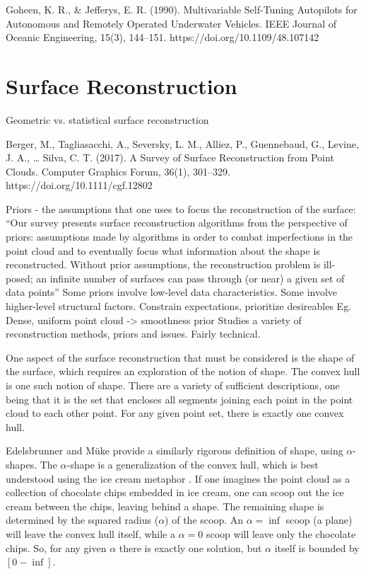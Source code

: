 \cite{Goheen1990}
Goheen, K. R., \& Jefferys, E. R. (1990). Multivariable Self-Tuning Autopilots for Autonomous and Remotely Operated Underwater Vehicles. IEEE Journal of Oceanic Engineering, 15(3), 144–151. https://doi.org/10.1109/48.107142

\section{Surface Reconstruction}

Geometric vs. statistical surface reconstruction

Berger, M., Tagliasacchi, A., Seversky, L. M., Alliez, P., Guennebaud, G., Levine, J. A., … Silva, C. T. (2017). A Survey of Surface Reconstruction from Point Clouds. Computer Graphics Forum, 36(1), 301–329. https://doi.org/10.1111/cgf.12802

Priors - the assumptions that one uses to focus the reconstruction of the surface:
“Our survey presents surface reconstruction algorithms from the perspective of priors: assumptions made by algorithms in order to combat imperfections in the point cloud and to eventually focus what information about the shape is reconstructed. Without prior assumptions, the reconstruction problem is ill-posed; an infinite number of surfaces can pass through (or near) a given set of data points”
Some priors involve low-level data characteristics. Some involve higher-level structural factors.
Constrain expectations, prioritize desireables
Eg. Dense, uniform point cloud -> smoothness prior
Studies a variety of reconstruction methods, priors and issues. 
Fairly technical.


One aspect of the surface reconstruction that must be considered is the shape of the surface, which requires an exploration of the notion of shape. The convex hull is one such notion of shape. There are a variety of sufficient descriptions, one being that it is the set that encloses all segments joining each point in the point cloud to each other point. For any given point set, there is exactly one convex hull.

Edelsbrunner and Müke \cite{Edelsbrunner1994}	provide a similarly rigorous definition of shape, using $\alpha$-shapes. The $\alpha$-shape is a generalization of the convex hull, which is best understood using the ice cream metaphor \cite{cgal:dy-as3-18b}. If one imagines the point cloud as a collection of chocolate chips embedded in ice cream, one can scoop out the ice cream between the chips, leaving behind a shape. The remaining shape is determined by the squared radius ($\alpha$) of the scoop. An $\alpha = \inf$ scoop (a plane) will leave the convex hull itself, while a $\alpha = 0$ scoop will leave only the chocolate chips. So, for any given $\alpha$ there is exactly one solution, but $\alpha$ itself is bounded by $[0-\inf]$.

